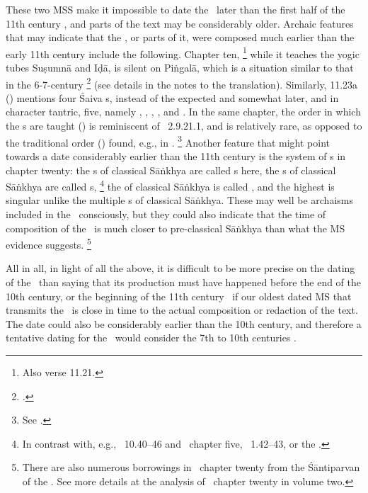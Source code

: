 These two MSS make it impossible to date the \VSS\ later 
than the first half of the 11th century \CE, and parts of the text
may be considerably older.
Archaic features that may indicate 
that the \VSS, or parts of it, were
composed much earlier than the early 11th century
include the following. Chapter ten,%
		\footnote{Also verse 11.21.} 
while it teaches the yogic tubes
 Suṣumnā and Iḍā, is silent on Piṅgalā, 
which is a situation similar to that in 
the 6-7-century \NisvNaya%
	\footnote{.}  
(see details in the notes to the translation).
Similarly, 11.23a () mentions four
Śaiva s, instead of the expected and 
somewhat later, and in character tantric, five, namely
, , , 
, and . In the same chapter,
the order in which the s are taught
() 
is reminiscent of \Apastambadharmasutra\ 2.9.21.1,
and is relatively rare,
as opposed to the traditional order () found, e.g., in
\MANU.%
                \footnote{See .}
Another feature that might point towards a date
considerably earlier than the 11th century is the 
system of s in chapter twenty:
the s of classical Sāṅkhya are called 
s here, the s of
classical Sāṅkhya are called s,%
		\footnote{In contrast with, e.g., \SDhU\ 10.40--46 and
					\Uums\ chapter five, \DharmP\ 1.42--43, or the \SivaUp.}
the  of classical Sāṅkhya
is called , and the highest  
is singular unlike the multiple s of classical 
Sāṅkhya. These may well be archaisms 
included in the \VSS\ consciously, but they could also
indicate that the time of composition of the \VSS\
is much closer to pre-classical Sāṅkhya than what the MS
evidence suggests.%
	\footnote{There are also numerous borrowings in \VSS\ chapter twenty
					from the Śāntiparvan of the \MBH. See more details
					at the analysis of \VSS\ chapter twenty in volume two.}

All in all, in light of all the above,
it is difficult to be more precise on the dating
of the \VSS\ than saying that its production must have
happened before the end of the 10th century, or the beginning
of the 11th century \CE\ if our oldest dated MS that transmits
the \VSS\ is close in time to the actual composition or
redaction of the text. The date could also be considerably
earlier than the 10th century, and therefore a tentative dating
for the \VSS\ would consider the 7th to 10th centuries \CE.




